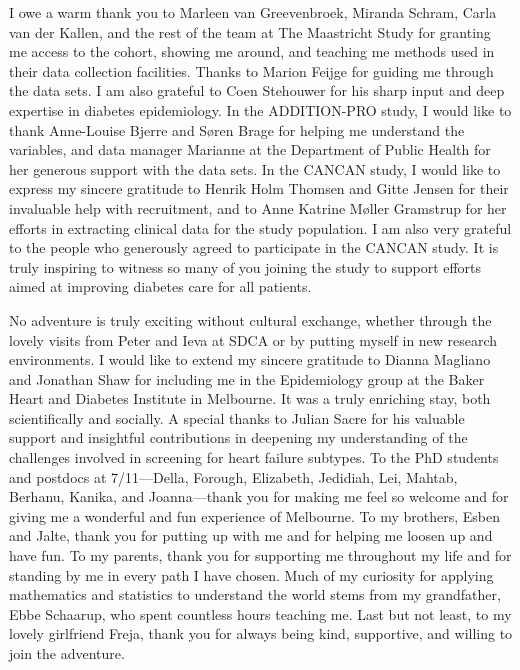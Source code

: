 \documentclass[
  a4paper,
  headsepline=true,
  open=left]{scrbook}
\begin{document}
I owe a warm thank you to Marleen van Greevenbroek, Miranda Schram,
Carla van der Kallen, and the rest of the team at The Maastricht Study
for granting me access to the cohort, showing me around, and teaching me
methods used in their data collection facilities. Thanks to Marion
Feijge for guiding me through the data sets. I am also grateful to Coen
Stehouwer for his sharp input and deep expertise in diabetes
epidemiology. In the ADDITION-PRO study, I would like to thank
Anne-Louise Bjerre and Søren Brage for helping me understand the
variables, and data manager Marianne at the Department of Public Health
for her generous support with the data sets. In the CANCAN study, I
would like to express my sincere gratitude to Henrik Holm Thomsen and
Gitte Jensen for their invaluable help with recruitment, and to Anne
Katrine Møller Gramstrup for her efforts in extracting clinical data for
the study population. I am also very grateful to the people who
generously agreed to participate in the CANCAN study. It is truly
inspiring to witness so many of you joining the study to support efforts
aimed at improving diabetes care for all patients.

No adventure is truly exciting without cultural exchange, whether
through the lovely visits from Peter and Ieva at SDCA or by putting
myself in new research environments. I would like to extend my sincere
gratitude to Dianna Magliano and Jonathan Shaw for including me in the
Epidemiology group at the Baker Heart and Diabetes Institute in
Melbourne. It was a truly enriching stay, both scientifically and
socially. A special thanks to Julian Sacre for his valuable support and
insightful contributions in deepening my understanding of the challenges
involved in screening for heart failure subtypes. To the PhD students
and postdocs at 7/11---Della, Forough, Elizabeth, Jedidiah, Lei, Mahtab,
Berhanu, Kanika, and Joanna---thank you for making me feel so welcome
and for giving me a wonderful and fun experience of Melbourne. To my
brothers, Esben and Jalte, thank you for putting up with me and for
helping me loosen up and have fun. To my parents, thank you for
supporting me throughout my life and for standing by me in every path I
have chosen. Much of my curiosity for applying mathematics and
statistics to understand the world stems from my grandfather, Ebbe
Schaarup, who spent countless hours teaching me. Last but not least, to
my lovely girlfriend Freja, thank you for always being kind, supportive,
and willing to join the adventure.

\end{document}
